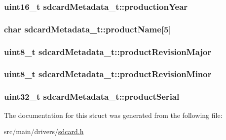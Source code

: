 \hypertarget{structsdcardMetadata__t_ae1deaaabf9547a5f892d25843be4260a}{
\subsubsection[{production\+Year}]{\setlength{\rightskip}{0pt plus 5cm}uint16\+\_\+t sdcard\+Metadata\+\_\+t\+::production\+Year}}\label{structsdcardMetadata__t_ae1deaaabf9547a5f892d25843be4260a}
\hypertarget{structsdcardMetadata__t_a38244751d4c6a70e265e07c57f2cb3ea}{
\subsubsection[{product\+Name}]{\setlength{\rightskip}{0pt plus 5cm}char sdcard\+Metadata\+\_\+t\+::product\+Name\mbox{[}5\mbox{]}}}\label{structsdcardMetadata__t_a38244751d4c6a70e265e07c57f2cb3ea}
\hypertarget{structsdcardMetadata__t_ab75109da7824782c91d2396d997daabc}{
\subsubsection[{product\+Revision\+Major}]{\setlength{\rightskip}{0pt plus 5cm}uint8\+\_\+t sdcard\+Metadata\+\_\+t\+::product\+Revision\+Major}}\label{structsdcardMetadata__t_ab75109da7824782c91d2396d997daabc}
\hypertarget{structsdcardMetadata__t_aff1572b9b561a856b1e93a0d4fbcb580}{
\subsubsection[{product\+Revision\+Minor}]{\setlength{\rightskip}{0pt plus 5cm}uint8\+\_\+t sdcard\+Metadata\+\_\+t\+::product\+Revision\+Minor}}\label{structsdcardMetadata__t_aff1572b9b561a856b1e93a0d4fbcb580}
\hypertarget{structsdcardMetadata__t_a528ed317b5b03ac4cf66e07abd4b9ac9}{
\subsubsection[{product\+Serial}]{\setlength{\rightskip}{0pt plus 5cm}uint32\+\_\+t sdcard\+Metadata\+\_\+t\+::product\+Serial}}\label{structsdcardMetadata__t_a528ed317b5b03ac4cf66e07abd4b9ac9}


The documentation for this struct was generated from the following file\+:\begin{DoxyCompactItemize}
\item 
src/main/drivers/\hyperlink{sdcard_8h}{sdcard.\+h}\end{DoxyCompactItemize}
